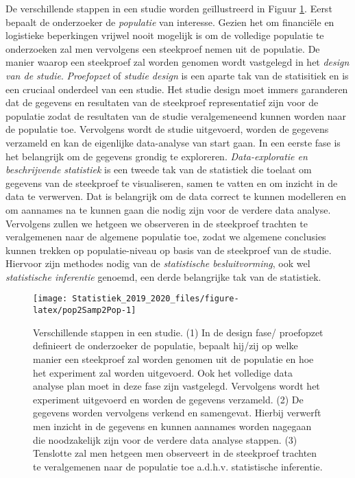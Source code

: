 \documentclass[12pt,dutch,coursenotes]{book}
\theoremstyle{definition}
\theoremstyle{definition}
\theoremstyle{definition}
\theoremstyle{remark}
\begin{document}
De verschillende stappen in een studie worden geïllustreerd in Figuur
\ref{fig:pop2Samp2Pop}. Eerst bepaalt de onderzoeker de \emph{populatie}
van interesse. Gezien het om financiële en logistieke beperkingen
vrijwel nooit mogelijk is om de volledige populatie te onderzoeken zal
men vervolgens een steekproef nemen uit de populatie. De manier waarop
een steekproef zal worden genomen wordt vastgelegd in het \emph{design
van de studie}. \emph{Proefopzet} of \emph{studie design} is een aparte
tak van de statisitiek en is een cruciaal onderdeel van een studie. Het
studie design moet immers garanderen dat de gegevens en resultaten van
de steekproef representatief zijn voor de populatie zodat de resultaten
van de studie veralgemeneend kunnen worden naar de populatie toe.
Vervolgens wordt de studie uitgevoerd, worden de gegevens verzameld en
kan de eigenlijke data-analyse van start gaan. In een eerste fase is het
belangrijk om de gegevens grondig te exploreren. \emph{Data-exploratie
en beschrijvende statistiek} is een tweede tak van de statistiek die
toelaat om gegevens van de steekproef te visualiseren, samen te vatten
en om inzicht in de data te verwerven. Dat is belangrijk om de data
correct te kunnen modelleren en om aannames na te kunnen gaan die nodig
zijn voor de verdere data analyse. Vervolgens zullen we hetgeen we
observeren in de steekproef trachten te veralgemenen naar de algemene
populatie toe, zodat we algemene conclusies kunnen trekken op
populatie-niveau op basis van de steekproef van de studie. Hiervoor zijn
methodes nodig van de \emph{statistische besluitvorming}, ook wel
\emph{statistische inferentie} genoemd, een derde belangrijke tak van de
statistiek.

\begin{figure}

{\centering \texttt{[image: Statistiek\_2019\_2020\_files/figure-latex/pop2Samp2Pop-1]} 

}

\caption{Verschillende stappen in een studie. (1) In de design fase/ proefopzet definieert de onderzoeker de populatie, bepaalt hij/zij op welke manier een steekproef zal worden genomen uit de populatie en hoe het experiment zal worden uitgevoerd. Ook het volledige data analyse plan moet in deze fase zijn vastgelegd. Vervolgens wordt het experiment uitgevoerd en worden de gegevens verzameld. (2) De gegevens worden vervolgens verkend en samengevat. Hierbij verwerft men inzicht in de gegevens en kunnen aannames worden nagegaan die noodzakelijk zijn voor de verdere data analyse stappen. (3) Tenslotte zal men hetgeen men observeert in de steekproef trachten te veralgemenen naar de populatie toe a.d.h.v. statistische inferentie.}\label{fig:pop2Samp2Pop}
\end{figure}
\end{document}
